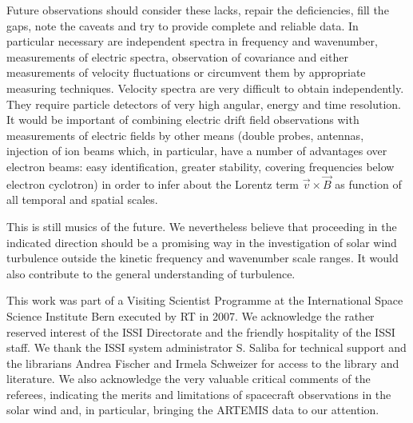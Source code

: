 \documentclass[ ]{copernicus2}
\begin{document}
{{{{Future observations should consider these lacks, repair the deficiencies, fill the gaps, note the caveats and try to provide complete and reliable data. In particular necessary are independent spectra in frequency and wavenumber, measurements of electric spectra, observation of covariance and either measurements of velocity fluctuations or circumvent them by appropriate measuring techniques. Velocity spectra are very difficult to obtain independently. They require particle detectors of very high angular, energy and time resolution. It would be important of combining electric drift field observations with measurements of electric fields by other means (double probes, antennas, injection of ion beams which, in particular, have a number of advantages over electron beams: easy identification, greater stability, covering frequencies below electron cyclotron) in order to infer about the Lorentz term $\vec{v}\times\vec{B}$ as function of all temporal and spatial scales.} 

{This is still musics of the future. We nevertheless believe that proceeding in the indicated direction should be a promising way in the investigation of solar wind turbulence outside the kinetic frequency and wavenumber scale ranges. It would also contribute to the general understanding of turbulence.}

\begin{acknowledgement}
This work was part of a Visiting Scientist Programme at the International Space Science Institute Bern executed by RT in 2007. We acknowledge the rather reserved interest of the ISSI Directorate and the friendly hospitality of the ISSI staff. We thank the ISSI system administrator S. Saliba for technical support and the librarians Andrea Fischer and Irmela Schweizer for access to the library and literature. {We also acknowledge the very valuable critical comments of the referees, indicating the merits and limitations of spacecraft observations in the solar wind and, in particular, bringing the ARTEMIS data to our attention.}
\end{acknowledgement}






}}}
\end{document}
